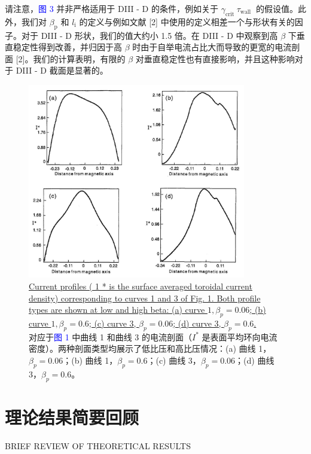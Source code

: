 \documentclass[utf8]{ctexart}
\begin{document}
\begin{sloppypar}
{请注意，\textcolor{blue}{图 3} 并非严格适用于 DIII - D 的条件，例如关于 $\gamma_{\text {crit }} \tau_{\text {wall }}$ 的假设值。此外，我们对 $\beta_{\mathrm{p}}$ 和 $l_{\mathrm{i}}$ 的定义与例如文献 \textcolor{green!50!black}{[2]} 中使用的定义相差一个与形状有关的因子。对于 DIII - D 形状，我们的值大约小 1.5 倍。在 DIII - D 中观察到高 $\beta$ 下垂直稳定性得到改善，并归因于高 $\beta$ 时由于自举电流占比大而导致的更宽的电流剖面 \textcolor{green!50!black}{[2]}。我们的计算表明，有限的 $\beta$ 对垂直稳定性也有直接影响，并且这种影响对于 DIII - D 截面是显著的。 }
  \begin{figure}[H]
  	\centering
  	\includegraphics[max width=0.85\textwidth,max height=0.35\textheight]{2025_01_10_a0135324997886412d98g-4}
 \caption{\uline{Current profiles ( 1 * is the surface averaged toroidal current density) corresponding to curves 1 and 3 of Fig. 1. Both profile types are shown at low and high beta: (a) curve $1, \beta_{p}=0.06$; (b) curve $1, \beta_{p}=0.6$; (c) curve 3, $\beta_{p}=0.06$; (d) curve 3, $\beta_{p}=0.6$.}\\对应于\textcolor{blue}{图 1} 中曲线 1 和曲线 3 的电流剖面（$I^{*}$ 是表面平均环向电流密度）。两种剖面类型均展示了低比压和高比压情况：(a) 曲线 1，$\beta_{p}=0.06$；(b) 曲线 1，$\beta_{p}=0.6$；(c) 曲线 3，$\beta_{p}=0.06$；(d) 曲线 3，$\beta_{p}=0.6$。 }
  	\label{fig2.}
  \end{figure}
  
   
  
 \section{理论结果简要回顾}
 {  \small BRIEF REVIEW OF THEORETICAL RESULTS \par }
 

\end{sloppypar}
\end{document}
